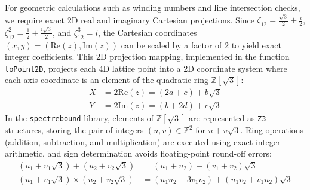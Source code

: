 \documentclass[11pt, a4paper]{amsart}
\begin{document}
For geometric calculations such as winding numbers and line intersection checks, we require exact 2D real and imaginary Cartesian projections. Since $\zeta_{12} = \frac{\sqrt{3}}{2} + \frac{i}{2}$, $\zeta_{12}^2 = \frac{1}{2} + \frac{i\sqrt{3}}{2}$, and $\zeta_{12}^3 = i$, the Cartesian coordinates $(x, y) = (\text{Re}(z), \text{Im}(z))$ can be scaled by a factor of 2 to yield exact integer coefficients. This 2D projection mapping, implemented in the function \texttt{toPoint2D}, projects each 4D lattice point into a 2D coordinate system where each axis coordinate is an element of the quadratic ring $\mathbb{Z}[\sqrt{3}]$:
\begin{equation}
\begin{aligned}
X &= 2\text{Re}(z) = (2a + c) + b\sqrt{3} \\
Y &= 2\text{Im}(z) = (b + 2d) + c\sqrt{3}
\end{aligned}
\end{equation}
In the \texttt{spectrebound} library, elements of $\mathbb{Z}[\sqrt{3}]$ are represented as \texttt{Z3} structures, storing the pair of integers $(u, v) \in \mathbb{Z}^2$ for $u + v\sqrt{3}$. Ring operations (addition, subtraction, and multiplication) are executed using exact integer arithmetic, and sign determination avoids floating-point round-off errors:
\begin{equation}
\begin{aligned}
(u_1 + v_1\sqrt{3}) + (u_2 + v_2\sqrt{3}) &= (u_1 + u_2) + (v_1 + v_2)\sqrt{3} \\
(u_1 + v_1\sqrt{3}) \times (u_2 + v_2\sqrt{3}) &= (u_1 u_2 + 3 v_1 v_2) + (u_1 v_2 + v_1 u_2)\sqrt{3}
\end{aligned}
\end{equation}
\end{document}
